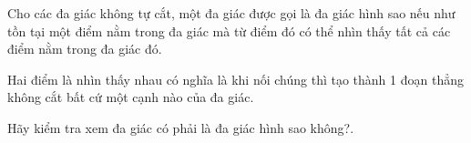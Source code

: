 Cho các đa giác không tự cắt, một đa giác được gọi là đa giác hình sao nếu như tồn tại một điểm nằm trong đa giác mà từ điểm đó có thể nhìn thấy tất cả các điểm nằm trong đa giác đó.   


   Hai điểm là nhìn thấy nhau có nghĩa là khi nối chúng thì tạo thành 1 đoạn thẳng không cắt bất cứ một cạnh nào của đa giác.   


   Hãy kiểm tra xem đa giác có phải là đa giác hình sao không?.